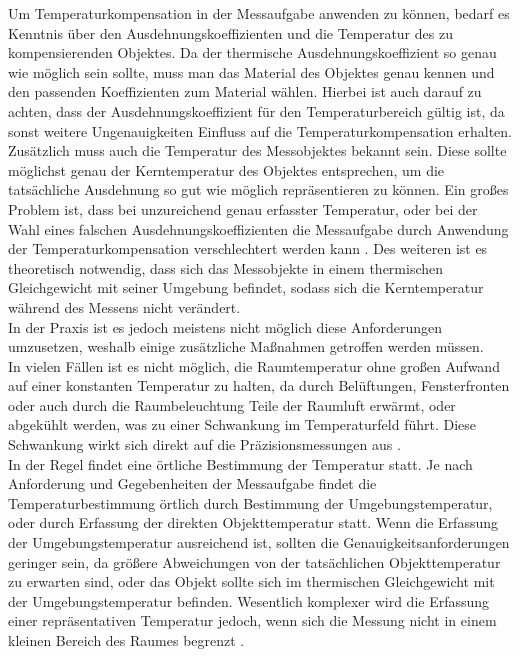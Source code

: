 Um Temperaturkompensation in der Messaufgabe anwenden zu können, bedarf es Kenntnis über den Ausdehnungskoeffizienten und die Temperatur des zu kompensierenden Objektes. Da der thermische Ausdehnungskoeffizient so genau wie möglich sein sollte, muss man das Material des Objektes genau kennen und den passenden Koeffizienten zum Material wählen. Hierbei ist auch darauf zu achten, dass der Ausdehnungskoeffizient für den Temperaturbereich gültig ist, da sonst weitere Ungenauigkeiten Einfluss auf die Temperaturkompensation erhalten.\\
Zusätzlich muss auch die Temperatur des Messobjektes bekannt sein. Diese sollte möglichst genau der Kerntemperatur des Objektes entsprechen, um die tatsächliche Ausdehnung so gut wie möglich repräsentieren zu können. Ein großes Problem ist, dass bei unzureichend genau erfasster Temperatur, oder bei der Wahl eines falschen Ausdehnungskoeffizienten die Messaufgabe durch Anwendung der Temperaturkompensation verschlechtert werden kann \cite{eschelbach2007}. Des weiteren ist es theoretisch notwendig, dass sich das Messobjekte in einem thermischen Gleichgewicht mit seiner Umgebung befindet, sodass sich die Kerntemperatur während des Messens nicht verändert.\\
In der Praxis ist es jedoch meistens nicht möglich diese Anforderungen umzusetzen, weshalb einige zusätzliche Maßnahmen getroffen werden müssen. \\
In vielen Fällen ist es nicht möglich, die Raumtemperatur ohne großen Aufwand auf einer konstanten Temperatur zu halten, da durch Belüftungen, Fensterfronten oder auch durch die Raumbeleuchtung  Teile der Raumluft erwärmt, oder abgekühlt werden, was zu einer Schwankung im Temperaturfeld führt. Diese Schwankung wirkt sich direkt auf die Präzisionsmessungen aus \cite{eschelbach2007}.\\
In der Regel findet eine örtliche Bestimmung der Temperatur statt. Je nach Anforderung und Gegebenheiten der Messaufgabe findet die Temperaturbestimmung örtlich durch Bestimmung der Umgebungstemperatur, oder durch Erfassung der direkten Objekttemperatur statt. Wenn die Erfassung der Umgebungstemperatur ausreichend ist, sollten die Genauigkeitsanforderungen geringer sein, da größere Abweichungen von der tatsächlichen Objekttemperatur zu erwarten sind, oder das Objekt sollte sich im thermischen Gleichgewicht mit der Umgebungstemperatur befinden. Wesentlich komplexer wird die Erfassung einer repräsentativen Temperatur jedoch, wenn sich die Messung nicht in einem kleinen Bereich des Raumes begrenzt \cite{eschelbach2007}.\\
